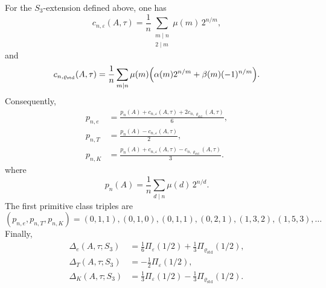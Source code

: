 \begin{corollary}
  \label{cor:s3-example-profile}
  For the \(S_3\)-extension defined above, one has
  \begin{equation}\label{eq:s3-example-primitive-sign-coefficients}
    c_{n,\varepsilon}(A,\tau)
    =
    \frac{1}{n}
      \sum_{\substack{m\mid n\\ 2\mid m}}
        \mu(m)\,2^{n/m},
  \end{equation}
  and
  \begin{equation}\label{eq:s3-example-primitive-rho-coefficients}
    c_{n,\varrho_{\mathrm{std}}}(A,\tau)
    =
    \frac{1}{n}
      \sum_{m\mid n}
        \mu(m)\Bigl(
          \alpha(m)2^{n/m}+\beta(m)(-1)^{n/m}
        \Bigr).
  \end{equation}
  Consequently,
  \begin{equation}\label{eq:s3-example-primitive-classes}
    \begin{aligned}
      p_{n,e}
      &=\frac{p_n(A)+c_{n,\varepsilon}(A,\tau)+2c_{n,\varrho_{\mathrm{std}}}(A,\tau)}{6}, \\
      p_{n,T}
      &=\frac{p_n(A)-c_{n,\varepsilon}(A,\tau)}{2}, \\
      p_{n,K}
      &=\frac{p_n(A)+c_{n,\varepsilon}(A,\tau)-c_{n,\varrho_{\mathrm{std}}}(A,\tau)}{3}.
    \end{aligned}
  \end{equation}
  where
  \begin{equation}\label{eq:s3-example-full-two-shift-primitive}
    p_n(A)=\frac{1}{n}\sum_{d\mid n}\mu(d)\,2^{n/d}.
  \end{equation}
  The first primitive class triples are
  \begin{equation}\label{eq:s3-example-primitive-first-terms}
    (p_{n,e},p_{n,T},p_{n,K})
    =(0,1,1),(0,1,0),(0,1,1),(0,2,1),(1,3,2),(1,5,3),\ldots
  \end{equation}
  Finally,
  \begin{equation}\label{eq:s3-example-delta-values}
    \begin{aligned}
      \Delta_e(A,\tau;S_3)
      &=\frac16\Pi_\varepsilon(1/2)+\frac13\Pi_{\varrho_{\mathrm{std}}}(1/2), \\
      \Delta_T(A,\tau;S_3)
      &=-\frac12\Pi_\varepsilon(1/2), \\
      \Delta_K(A,\tau;S_3)
      &=\frac13\Pi_\varepsilon(1/2)-\frac13\Pi_{\varrho_{\mathrm{std}}}(1/2).
    \end{aligned}

\end{equation}
\end{corollary}
